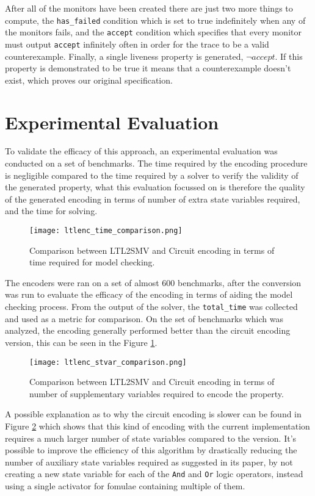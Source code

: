 After all of the monitors have been created there are just two more things to compute, the \texttt{has\_failed} condition which is set to true indefinitely when any of the monitors fails, and the \texttt{accept} condition which specifies that every monitor must output \texttt{accept} infinitely often in order for the trace to be a valid counterexample.
Finally, a single liveness property is generated, $\lnot \mathit{accept}$.
If this property is demonstrated to be true it means that a counterexample doesn't exist, which proves our original specification.


\section{Experimental Evaluation}

To validate the efficacy of this approach, an experimental evaluation was conducted on a set of benchmarks.
The time required by the encoding procedure is negligible compared to the time required by a solver to verify the validity of the generated property, what this evaluation focussed on is therefore the quality of the generated encoding in terms of number of extra state variables required, and the time for solving.

\begin{figure}
    \texttt{[image: ltlenc\_time\_comparison.png]}
    \caption{Comparison between LTL2SMV and Circuit encoding in terms of time required for model checking.}
    \label{fig:ltlenc_time_comparison}
\end{figure}

The encoders were ran on a set of almost 600 benchmarks, after the conversion \iceia{} was run to evaluate the efficacy of the encoding in terms of aiding the model checking process.
From the output of the solver, the \texttt{total\_time} was collected and used as a metric for comparison.
On the set of benchmarks which was analyzed, the \ltltosmv{} encoding generally performed better than the circuit encoding version, this can be seen in the Figure \ref{fig:ltlenc_time_comparison}.

\begin{figure}
    \texttt{[image: ltlenc\_stvar\_comparison.png]}
    \caption{Comparison between LTL2SMV and Circuit encoding in terms of number of supplementary variables required to encode the property.}
    \label{fig:ltlenc_stvar_comparison}
\end{figure}

A possible explanation as to why the circuit encoding is slower can be found in Figure \ref{fig:ltlenc_stvar_comparison} which shows that this kind of encoding with the current implementation requires a much larger number of state variables compared to the \ltltosmv{} version.
It's possible to improve the efficiency of this algorithm by drastically reducing the number of auxiliary state variables required as suggested in its paper, by not creating a new state variable for each of the \texttt{And} and \texttt{Or} logic operators, instead using a single activator for fomulae containing multiple of them.

